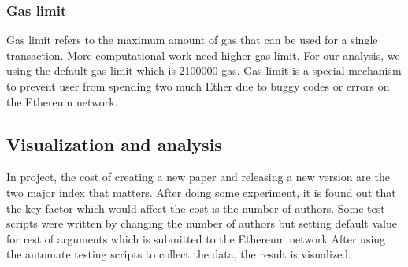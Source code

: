 \documentclass[openany,12pt]{ecsthesis}      %
\begin{document}
\subsubsection{Gas limit}
Gas limit refers to the maximum amount of gas that can be used for a single transaction.
More computational work need higher gas limit. For our analysis, we using the default gas limit which is 2100000 gas.
Gas limit is a special mechanism to prevent user from spending two much Ether due to buggy codes or errors on the Ethereum network. 
\subsection{Visualization and analysis}
In project, the cost of creating a new paper and releasing a new version are the two major index that matters.
After doing some experiment, it is found out that the key factor which would affect the cost is the number of authors.
Some test scripts were written by changing the number of authors 
but setting default value for rest of arguments which is submitted to the Ethereum network
After using the automate testing scripts to collect the data, the result is visualized.
\end{document}
